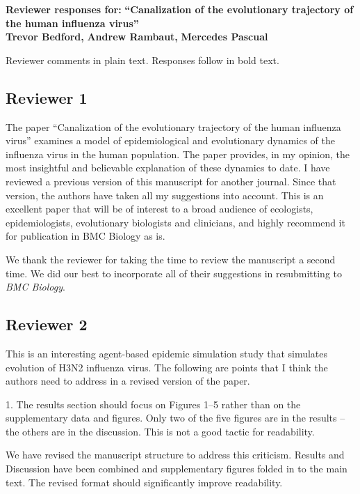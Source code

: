 \documentclass[11pt,oneside,letterpaper]{article}
\def\comment#1{
#1
}
\def\response#1{
\begin{bf}
#1
\end{bf}
}
\begin{document}
\setlength{\topmargin}{0in}
\setcounter{page}{1}

\begin{flushleft}
{\Large
\textbf{Reviewer responses for:}
\textbf{``Canalization of the evolutionary trajectory of the human influenza virus''}
}
\\
\textbf{Trevor Bedford,}
\textbf{Andrew Rambaut,} 
\textbf{Mercedes Pascual}
\end{flushleft}

Reviewer comments in plain text.  Responses follow in bold text.

\subsection*{Reviewer 1}

\comment{The paper ``Canalization of the evolutionary trajectory of the human influenza virus'' examines a model of epidemiological and evolutionary dynamics of the influenza virus in the human population. The paper provides, in my opinion, the most insightful and believable explanation of these dynamics to date. I have reviewed a previous version of this manuscript for another journal. Since that version, the authors have taken all my suggestions into account. This is an excellent paper that will be of interest to a broad audience of ecologists, epidemiologists, evolutionary biologists and clinicians, and highly recommend it for publication in BMC Biology as is.}

\response{We thank the reviewer for taking the time to review the manuscript a second time.  We did our best to incorporate all of their suggestions in resubmitting to \textit{BMC Biology}.}

\subsection*{Reviewer 2}

\comment{This is an interesting agent-based epidemic simulation study that simulates evolution of H3N2 influenza virus. The following are points that I think the authors need to address in a revised version of the paper.}

\comment{1. The results section should focus on Figures 1--5 rather than on the supplementary data and figures. Only two of the five figures are in the results -- the others are in the discussion. This is not a good tactic for readability.}

\response{We have revised the manuscript structure to address this criticism.  Results and Discussion have been combined and supplementary figures folded in to the main text.  The revised format should significantly improve readability.}
\end{document}
